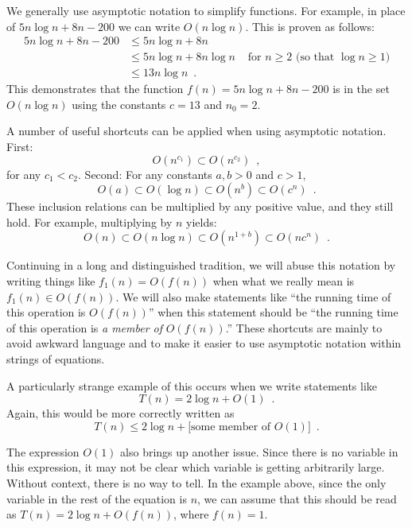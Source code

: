 We generally use asymptotic notation to simplify functions.  For example,
in place of $5n\log n + 8n - 200$ we can write $O(n\log n)$.
This is proven as follows:
\begin{align*} 
       5n\log n + 8n - 200
        & \le 5n\log n + 8n \\
        & \le 5n\log n + 8n\log n & \mbox{ for $n\ge 2$ (so that $\log n \ge 1$)}
            \\
        & \le 13n\log n  \enspace .
\end{align*}
This demonstrates that the function $f(n)=5n\log n + 8n - 200$ is in
the set $O(n\log n)$ using the constants $c=13$ and $n_0 = 2$.

A number of useful shortcuts can be applied when using asymptotic
notation.  First:
\[ O(n^{c_1}) \subset O(n^{c_2}) \enspace ,\]
for any $c_1 < c_2$.  Second: For any constants $a,b > 0$ and $c > 1$,
\[ O(a) \subset O(\log n) \subset O(n^{b}) \subset O({c}^n) \enspace . \]
These inclusion relations can be multiplied by any positive value,
and they still hold. For example, multiplying by $n$ yields:
\[ O(n) \subset O(n\log n) \subset O(n^{1+b}) \subset O(n{c}^n) \enspace . \]

Continuing in a long and distinguished tradition, we will abuse this
notation by writing things like $f_1(n) = O(f(n))$ when what we really
mean is $f_1(n) \in O(f(n))$.  We will also make statements like ``the
running time of this operation is $O(f(n))$'' when this statement should
be ``the running time of this operation is \emph{a member of} $O(f(n))$.''
These shortcuts are mainly to avoid awkward language and to make it
easier to use asymptotic notation within strings of equations.

A particularly strange example of this occurs when we write statements like
\[
  T(n) = 2\log n + O(1)  \enspace .
\]
Again, this would be more correctly written as
\[
  T(n) \le 2\log n + [\mbox{some member of $O(1)$]}  \enspace .
\]

The expression $O(1)$ also brings up another issue. Since there is
no variable in this expression, it may not be clear which variable is
getting arbitrarily large.  Without context, there is no way to tell.
In the example above, since the only variable in the rest of the equation
is $n$, we can assume that this should be read as $T(n) = 2\log n +
O(f(n))$, where $f(n) = 1$.

